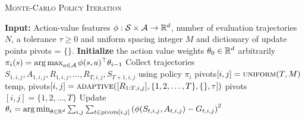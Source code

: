         \begin{algorithm}[t]
            \caption{\textsc{Monte-Carlo Policy Iteration}}\label{alg:mc}
            \begin{algorithmic}
            \State \textbf{Input:} Action-value features $\phi: \mathcal{S} \times \mathcal{A} \rightarrow \mathbb{R}^d$, number of evaluation trajectories $N$, a tolerance $\tau \geq 0$ and uniform spacing integer $M$ and dictionary of update points pivots = $\{\}$.
            \State \textbf{Initialize} the action value weights $\theta_0 \in \mathbb{R}^d$ arbitrarily
                \State $\pi_i(s) = \mathop{\rm arg\,max}_{a \in \mathcal{A}} \phi(s,a)^\top \theta_{i-1}$
                    \State Collect trajectories $S_{1,i,j},A_{1,i,j},R_{1,i,j},\dotsc,R_{T,i,j},S_{T+1,i,j}$ using policy $\pi_i$
                    \State pivots$[i,j] = \textsc{uniform}(T, M)$
                    \State temp, pivots$[i,j] = \textsc{adaptive}([R_{1:T,i,j}], \{1,2,\dotsc,T\},\{\}, \tau])$
                    \Else
                    \State pivots$[i,j]=\{1,2,\dotsc,T\}$
                    \EndIf
                \EndFor
                \State Update $\theta_i = \mathop{\rm arg\,min}_{\theta \in \mathbb{R}^d} \sum_{i,j}\sum_{t\in\text{pivots}[i,j]} \left(\phi(S_{t,i,j},A_{t,i,j}) - G_{t,i,j}\right)^2$
            \EndFor
            \end{algorithmic}
            \end{algorithm}
